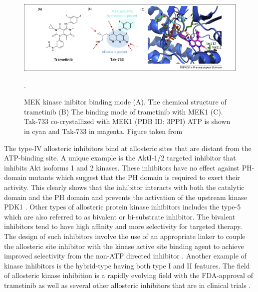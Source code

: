 \documentclass[a4paper, 11pt]{report}
\begin{document}
\begin{figure}[H]
	\includegraphics[width=\linewidth]{figures/trametinib.jpg}
	\centering
	\caption{MEK kinase inibitor binding mode (A). The chemical structure of trametinib (B) The binding mode of trametinib with MEK1 (C). Tak-733 co-crystallized with MEK1 (PDB ID: 3PPI) ATP is shown in cyan and Tak-733 in magenta. Figure taken from \cite{wu2015fda}}.
	\label{trametinib}
\end{figure}
The type-IV allosteric inhibitors bind at allosteric sites that are distant from the ATP-binding site. A unique example is the AktI-1/2 targeted inhibitor that inhibits Akt isoforms 1 and 2 kinases. These inhibitors have no effect against PH-domain mutants which suggest that the PH domain is required to exert their activity. This clearly shows that the inhibitor interacts with both the catalytic domain and the PH domain and prevents the activation of the upstream kinase PDK1 \cite{barnett2005identification}. Other types of allosteric protein kinase inhibitors includes the type-5 which are also referred to as bivalent or bi-substrate inhibitor. The bivalent inhibitors tend to have high affinity and more selectivity for targeted therapy. The design of such inhibitors involve the use of an appropriate linker to couple the allosteric site inhibitor with the kinase active site binding agent to achieve improved selectivity from the non-ATP directed inhibitor \cite {lamba2012new}. Another example of kinase inhibitors is the hybrid-type having both type I and II features. The field of allosteric kinase inhibition is a rapidly evolving field with the FDA-approval of trametinib as well as several other allosteric inhibitors that are in clinical trials \cite{wu2015allosteric}.
\end{document}
